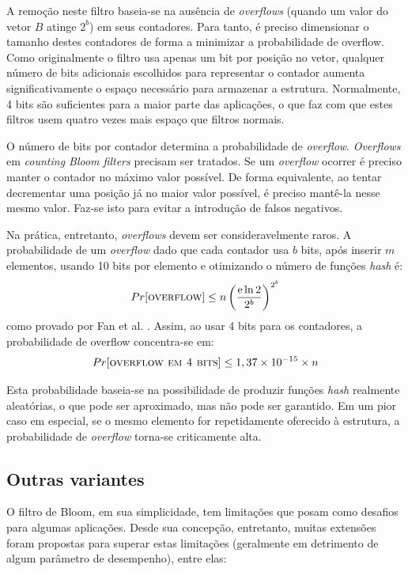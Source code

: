A remoção neste filtro baseia-se na ausência de \emph{overflows} (quando um valor do vetor $B$ atinge $2^b$) em seus contadores. Para tanto, é preciso dimensionar o tamanho destes contadores de forma a minimizar a probabilidade de overflow. Como originalmente o filtro usa apenas um bit por posição no vetor, qualquer número de bits adicionais escolhidos para representar o contador aumenta significativamente o espaço necessário para armazenar a estrutura. Normalmente, 4 bits são suficientes para a maior parte das aplicações, o que faz com que estes filtros usem quatro vezes mais espaço que filtros normais.

O número de bits por contador determina a probabilidade de \emph{overflow}. \emph{Overflows} em \emph{counting Bloom filters} precisam ser tratados. Se um \emph{overflow} ocorrer é preciso manter o contador no máximo valor possível. De forma equivalente, ao tentar decrementar uma posição já no maior valor possível, é preciso mantê-la nesse mesmo valor. Faz-se isto para evitar a introdução de falsos negativos.

Na prática, entretanto, \emph{overflows} devem ser consideravelmente raros. A probabilidade de um \emph{overflow} dado que cada contador usa $b$ bits, após inserir $m$ elementos, usando 10 bits por elemento e otimizando o número de funções \emph{hash} é:
\[
Pr[\textsc{overflow}] \leq n \left( \frac{\mathrm{e} \ln 2}{2^b} \right)^{2^b}
\]
como provado por Fan et al. \cite{fan1998summary}. Assim, ao usar 4 bits para os contadores, a probabilidade de overflow concentra-se em:
\[
Pr[\textsc{overflow em 4 bits}] \leq 1,37 \times 10^{-15} \times n
\]

Esta probabilidade baseia-se na possibilidade de produzir funções \emph{hash} realmente aleatórias, o que pode ser aproximado, mas não pode ser garantido. Em um pior caso em especial, se o mesmo elemento for repetidamente oferecido à estrutura, a probabilidade de \emph{overflow} torna-se criticamente alta.

\subsection{Outras variantes}\label{sec:bloom:variants}

O filtro de Bloom, em sua simplicidade, tem limitações que posam como desafios para algumas aplicações. Desde sua concepção, entretanto, muitas extensões foram propostas para superar estas limitações (geralmente em detrimento de algum parâmetro de desempenho), entre elas:

